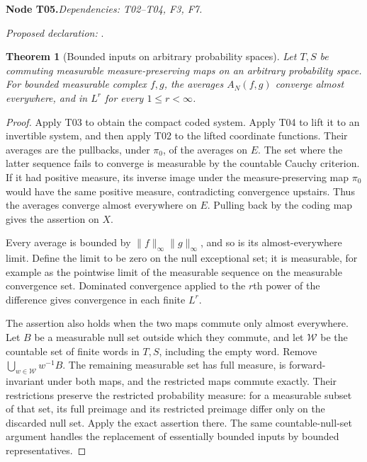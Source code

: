 \documentclass[11pt]{article}
\newtheorem{theorem}{Theorem}[section]
\theoremstyle{remark}\newtheorem{remark}[theorem]{Remark}
\newcommand{\bpnode}[3]{\par\Needspace{5\baselineskip}\noindent\textbf{Node #1.}\quad\textit{Dependencies: #2.}\par\noindent\textit{Proposed declaration:} \texttt{\detokenize{#3}}.\par\smallskip}
\begin{document}
\bpnode{T05}{T02--T04, F3, F7}{bounded_commuting_averages_ae_and_norm}
\begin{theorem}[Bounded inputs on arbitrary probability spaces]\label{thm:bounded}
Let $T,S$ be commuting measurable measure-preserving maps on an arbitrary probability space. For bounded measurable complex $f,g$, the averages $A_N(f,g)$ converge almost everywhere, and in $L^r$ for every $1\le r<\infty$.
\end{theorem}
\begin{proof}
Apply T03 to obtain the compact coded system. Apply T04 to lift it to an invertible system, and then apply T02 to the lifted coordinate functions. Their averages are the pullbacks, under $\pi_0$, of the averages on $E$. The set where the latter sequence fails to converge is measurable by the countable Cauchy criterion. If it had positive measure, its inverse image under the measure-preserving map $\pi_0$ would have the same positive measure, contradicting convergence upstairs. Thus the averages converge almost everywhere on $E$. Pulling back by the coding map gives the assertion on $X$.

Every average is bounded by $\|f\|_\infty\|g\|_\infty$, and so is its almost-everywhere limit. Define the limit to be zero on the null exceptional set; it is measurable, for example as the pointwise limit of the measurable sequence on the measurable convergence set. Dominated convergence applied to the $r$th power of the difference gives convergence in each finite $L^r$.

The assertion also holds when the two maps commute only almost everywhere. Let $B$ be a measurable null set outside which they commute, and let $\mathcal W$ be the countable set of finite words in $T,S$, including the empty word. Remove $\bigcup_{w\in\mathcal W}w^{-1}B$. The remaining measurable set has full measure, is forward-invariant under both maps, and the restricted maps commute exactly. Their restrictions preserve the restricted probability measure: for a measurable subset of that set, its full preimage and its restricted preimage differ only on the discarded null set. Apply the exact assertion there. The same countable-null-set argument handles the replacement of essentially bounded inputs by bounded representatives.
\end{proof}
\end{document}
